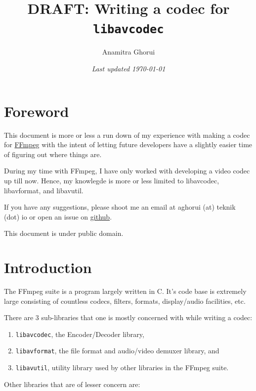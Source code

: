 \documentclass{article}
\begin{document}
\let\includegraphicsold\includegraphics
\renewcommand{\includegraphics}[1]{}

\title{DRAFT: Writing a codec for \texttt{libavcodec}}
\author{Anamitra Ghorui}
\date{\emph{Last updated \today}}
\maketitle

\tableofcontents

\section{Foreword}

This document is more or less a run down of my experience with making a codec 
for \href{https://ffmpeg.org}{FFmpeg} with the intent of letting future
developers have a slightly easier time of figuring out where things are.

During my time with FFmpeg, I have only worked with developing a video codec up till now. Hence, my knowlegde is more or less limited to libavcodec, libavformat, and libavutil.

If you have any suggestions, please shoot me an email at aghorui (at) teknik (dot) io or open an issue on \href{https://github.com/daujerrine/ffmpeg-doc}{github}.

This document is under public domain.

\section{Introduction}

The FFmpeg suite is a program largely written in C. It's code base is extremely large consisting of countless codecs, filters, formats, display/audio facilities, etc.

There are 3 sub-libraries that one is mostly concerned with while writing a codec:

\begin{enumerate}
\item \texttt{libavcodec}, the Encoder/Decoder library,
\item \texttt{libavformat}, the file format and audio/video demuxer library, and
\item \texttt{libavutil}, utility library used by other libraries in the FFmpeg suite.
\end{enumerate}

Other libraries that are of lesser concern are:
\end{document}
